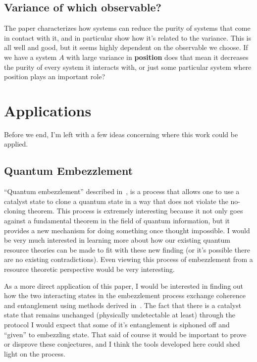 \documentclass[11pt,english]{article}
\theoremstyle{definition}
\begin{document}
\subsection{Variance of which observable?}
The paper characterizes how systems can reduce the purity of systems that come in contact with it, and in particular show how it's related to the variance. This is all well and good, but it seems highly dependent on the observable we choose. If we have a system $A$ with large variance in \textbf{position} does that mean it decreases the purity of every system it interacts with, or just some particular system where position plays an important role?

\section{Applications}

Before we end, I'm left with a few ideas concerning where this work could be applied.

\subsection{Quantum Embezzlement}
``Quantum embezzlement'' described in~\cite{embezzlement,self-embezzlement}, is a process that allows one to use a catalyst state to clone a quantum state in a way that does not violate the no-cloning theorem. This process is extremely interesting because it not only goes against a fundamental theorem in the field of quantum information, but it provides a new mechanism for doing something once thought impossible. I would be very much interested in learning more about how our existing quantum resource theories can be made to fit with these new finding (or it's possible there are no existing contradictions). Even viewing this process of embezzlement from a resource theoretic perspective would be very interesting.

As a more direct application of this paper, I would be interested in finding out how the two interacting states in the embezzlement process exchange coherence and entanglement using methods derived in~\cite{dynamic-entropies}. The fact that there is a catalyst state that remains unchanged (physically undetectable at least) through the protocol I would expect that some of it's entanglement is siphoned off and ``given'' to embezzling state. That said of course it would be important to prove or disprove these conjectures, and I think the tools developed here could shed light on the process.
\end{document}
